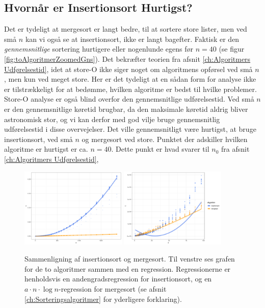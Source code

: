 \subsection{Hvornår er Insertionsort Hurtigst?}%
\label{sub:Store-O er Værste Tilfælde}
Det er tydeligt at mergesort er langt bedre, til at sortere store lister, men ved små $n$ kan vi også se at insertionsort, ikke er langt bagefter. Faktisk er den \emph{gennemsnitlige} sortering hurtigere eller nogenlunde egens før $n = 40$ (se figur \ref{fig:toAlgoritmerZoomedGns}). Det bekræfter teorien fra afsnit \ref{ch:Algoritmers Udførelsestid}, idet at store-O ikke siger noget om algoritmens opførsel ved små $n$, men kun ved meget store. Her er det tydeligt at en sådan form for analyse ikke er tilstrækkeligt for at bedømme, hvilken algoritme er bedst til hvilke problemer. Store-O analyse er også blind overfor den gennemsnitlige udførelsestid. Ved små $n$ er den gennemsnitlige køretid brugbar, da den maksimale køretid aldrig bliver astronomisk stor, og vi kan derfor med god vilje bruge gennemsnitlig udførelsestid i disse overvejelser. Det ville gennemsnitligt være hurtigst, at bruge insertionsort, ved små $n$ og mergesort ved store. Punktet der adskiller hvilken algoritme er hurtigst er ca. $n = 40$. Dette punkt er hvad svarer til $n_0$ fra afsnit \ref{ch:Algoritmers Udførelsestid}, 




\begin{figure} \centering
	\includegraphics[width=0.45\textwidth]{../img/toAlgoritmer.png}
	\includegraphics[width=0.45\textwidth]{../img/toAlgoritmerZoomed}
	\caption{Sammenligning af insertionsort og mergesort. Til venstre ses grafen for de to algoritmer sammen med en regression. Regressionerne er henholdsvis en andengradsregression for insertionsort, og en $a \cdot n \cdot \log n$-regression for mergesort (se afsnit \ref{ch:Sorteringsalgoritmer} for yderligere forklaring).}
	\label{fig:plot - to algoritmer}
\end{figure}

